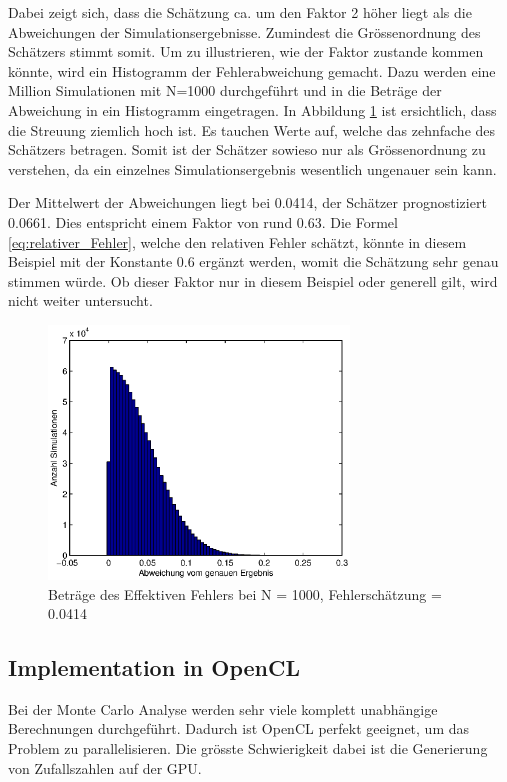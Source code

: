 \documentclass{book}
\begin{document}
\begin{refsection}
Dabei zeigt sich, dass die Schätzung ca. um den Faktor 2 höher liegt als die Abweichungen der Simulationsergebnisse. Zumindest die Grössenordnung des Schätzers stimmt somit. Um zu illustrieren, wie der Faktor zustande kommen könnte, wird ein Histogramm der Fehlerabweichung gemacht. Dazu werden eine Million Simulationen mit N=1000 durchgeführt und in die Beträge der Abweichung in ein Histogramm eingetragen. In Abbildung \ref{fig:Histogramm} ist ersichtlich, dass die Streuung ziemlich hoch ist. Es tauchen Werte auf, welche das zehnfache des Schätzers betragen. Somit ist der Schätzer sowieso nur als Grössenordnung zu verstehen, da ein einzelnes Simulationsergebnis wesentlich ungenauer sein kann.

Der Mittelwert der Abweichungen liegt bei 0.0414, der Schätzer prognostiziert 0.0661. Dies entspricht einem Faktor von rund 0.63. Die Formel \ref{eq:relativer_Fehler}, welche den relativen Fehler schätzt, könnte in diesem Beispiel mit der Konstante 0.6 ergänzt werden, womit die Schätzung sehr genau stimmen würde. Ob dieser Faktor nur in diesem Beispiel oder generell gilt, wird nicht weiter untersucht.

\begin{figure}[h]
    \centering
    \includegraphics[width=8cm]{images/Histogramm.eps}
    \caption{Beträge des Effektiven Fehlers bei N = 1000, Fehlerschätzung = 0.0414}
    \label{fig:Histogramm}
\end{figure}



\subsection{Implementation in OpenCL}
Bei der Monte Carlo Analyse werden sehr viele komplett unabhängige Berechnungen durchgeführt. Dadurch ist OpenCL perfekt geeignet, um das Problem zu parallelisieren. Die grösste Schwierigkeit dabei ist die Generierung von Zufallszahlen auf der GPU. 


\end{refsection}
\end{document}
